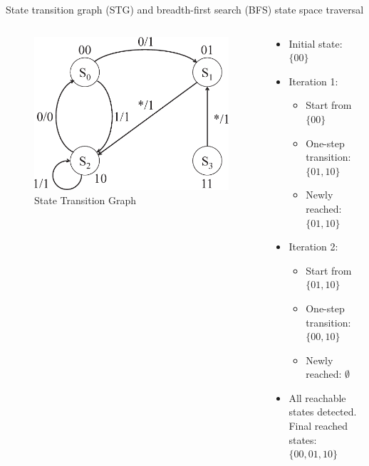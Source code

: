 \documentclass[xcolor=dvipsnames]{beamer}
\newcommand{\bi}{\begin{itemize}}
\newcommand{\ei}{\end{itemize}}
\begin{document}
\begin{frame}{\large {State transition graph (STG) and breadth-first search (BFS) state space traversal}}
\begin{columns}[onlytextwidth]
\begin{column}{0.5\textwidth}
\begin{figure}
\centering
\includegraphics[scale=0.25]{stg_fig.eps}
\caption{State Transition Graph}
\end{figure}
\end{column}
\begin{column}{0.5\textwidth}
\bi
\item Initial state: $\{00\}$
\item Iteration 1: 
	\bi
	\item Start from $\{00\}$
	\item One-step transition: $\{01,10\}$
	\item Newly reached: $\{01,10\}$
	\ei
\item Iteration 2: 
	\bi
	\item Start from $\{01,10\}$
	\item One-step transition: $\{00,10\}$
	\item Newly reached: $\emptyset$
	\ei
\item All reachable states detected. Final reached states: $\{00,01,10\}$
\ei
\end{column}
\end{columns}

\end{frame}
\end{document}
